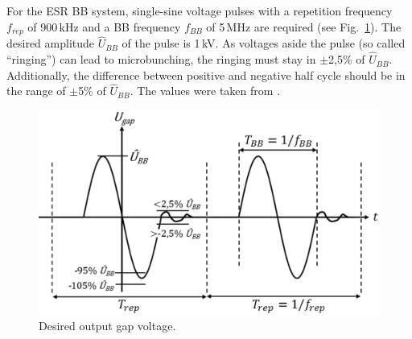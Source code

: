 \documentclass[a4paper,
               keeplastbox,%
               nospread%
              ]{jacow}
\begin{document}
	For the ESR BB system, single-sine voltage pulses with a repetition frequency $f_{rep}$ of 900\,kHz and a BB frequency $f_{BB}$ of 5\,MHz are required 
	(see Fig.~\ref{bb_signal}). The desired amplitude $\hat{U}_{BB}$ of the pulse is 1\,kV. As voltages aside the pulse (so called ``ringing'') can 
	lead to microbunching, the ringing must	stay in $\pm$2,5\% of $\hat{U}_{BB}$. Additionally, the difference between positive and negative half cycle 
	should be in the range of $\pm$5\% of $\hat{U}_{BB}$. 
	The values were taken from \cite{SIS100_spec}.
	
%	
%	
  \begin{figure}[!htb]
	\centering
	\includegraphics[scale=0.42]{WEPVA047f1.eps}
	\caption{Desired output gap voltage.}
\label{bb_signal}
\end{figure}
	  
\end{document}
